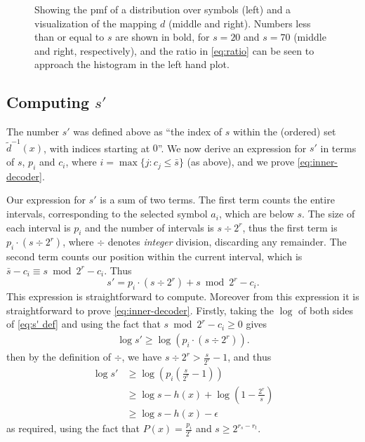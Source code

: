 \documentclass{article}
\theoremstyle{definition}
\begin{document}
\begin{figure}[ht]
  \centering
  \drawpmf \quad {} \quad {}
  \caption{
    Showing the pmf of a distribution over symbols (left) and a visualization
    of the mapping \(d\) (middle and right).  Numbers less than or equal to
    \(s\) are shown in bold, for \(s=20\) and \(s=70\) (middle and right,
    respectively), and the ratio in \cref{eq:ratio} can be seen to approach
    the histogram in the left hand plot.
  }\label{fig:visual-ans}
\end{figure}

\subsection{Computing \(s'\)}
The number \(s'\) was defined above as ``the index of \(s\) within the
(ordered) set \(\tilde d^{-1}(x)\), with indices starting at \(0\)''. We now
derive an expression for \(s'\) in terms of \(s\), \(p_i\) and \(c_i\), where
\(i = \max\{j: c_j \leq \bar s\}\) (as above), and we prove
\cref{eq:inner-decoder}.

Our expression for \(s'\) is a sum of two terms. The first term counts the
entire intervals, corresponding to the selected symbol \(a_i\), which are below
\(s\). The size of each interval is \(p_i\) and the number of intervals is
\(s\div 2^{r}\), thus the first term is \(p_i \cdot (s \div 2^{r})\), where
\(\div\) denotes \emph{integer} division, discarding any remainder.  The second
term counts our position within the current interval, which is \(\bar s - c_i
\equiv s\bmod 2^{r} - c_i\). Thus
\begin{equation}\label{eq:s' def}
  s' = p_i \cdot (s \div 2^{r}) + s\bmod 2^{r} - c_i.
\end{equation}
This expression is straightforward to compute. Moreover from this expression it
is straightforward to prove \cref{eq:inner-decoder}. Firstly, taking the
\(\log\) of both sides of \cref{eq:s' def} and using the fact that \(s\bmod
2^{r} - c_i \geq 0\) gives
\begin{align}
  \log s' \geq \log (p_i\cdot (s\div 2^{r})).
\end{align}
then by the definition of \(\div\), we have \(s\div 2^{r} > \frac{s}{2^{r}}
- 1\), and thus
\begin{align}
  \log s'
    &\geq \log\left(p_i\left(\frac{s}{2^{r}} -1\right)\right)\\
    &\geq \log s - h(x) + \log\left(1 - \frac{2^{r}}{s}\right)\\
    &\geq \log s - h(x) - \epsilon
\end{align}
as required, using the fact that \(P(x) = \frac{p_i}{2^{r}}\) and \(s \geq
2^{r_s - r_t}\).
\end{document}
